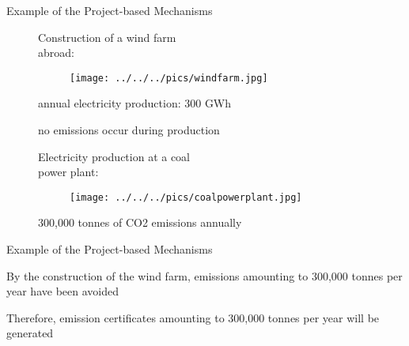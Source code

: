 {Example of the Project-based Mechanisms}
\begin{figure}[t]
\begin{minipage}[t]{0.475\textwidth}
Construction of a wind farm \\
abroad:
\vspace*{-0.2cm}
\begin{figure}[h!]
\centering
\texttt{[image: ../../../pics/windfarm.jpg]}
\end{figure}
\vspace*{-0.4cm}






	annual electricity production: 300 GWh


	no emissions occur during production




\end{minipage}
\begin{minipage}[t]{0.475\textwidth}
Electricity production at a coal \\
power plant:
\vspace*{-0.2cm}
\begin{figure}[h!]
\centering
\texttt{[image: ../../../pics/coalpowerplant.jpg]}
\end{figure}
\vspace*{-0.4cm}






	300,000 tonnes of CO2 emissions annually




\end{minipage}
\end{figure}


{Example of the Project-based Mechanisms}






	By the construction of the wind farm, emissions amounting to 300,000 tonnes per year have been avoided


	Therefore, emission certificates amounting to 300,000 tonnes per year will be generated






